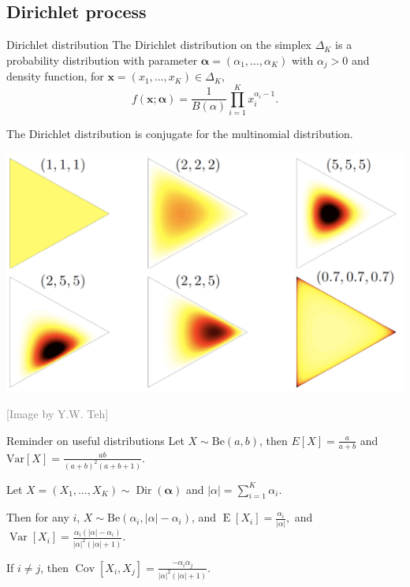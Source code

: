 \subsection{Dirichlet process}

\begin{frame}{Dirichlet distribution}
	The \alert{Dirichlet distribution} on the simplex $\Delta_K$ is a probability distribution with parameter $\boldsymbol{\alpha} = (\alpha_1,\ldots,\alpha_K)$ with $\alpha_j>0$ and density function, for $\boldsymbol{x} = (x_1, \ldots, x_K)\in \Delta_K$,
\begin{displaymath}
f(\boldsymbol{x}; \boldsymbol{\alpha}) = \frac{1}{B(\alpha)}\prod_{i=1}^Kx_i^{\alpha_i - 1}.
\end{displaymath}

The Dirichlet distribution is \alert{conjugate} for the \alert{multinomial distribution}. 

\begin{center}
\includegraphics[width = .6\textwidth]{figures_julyan/intro_DP/dirichlet_distribution}
\end{center}
\hfill\textcolor{gray}{[Image by Y.W. Teh]}
\end{frame}


\begin{frame}{Reminder on useful distributions}
	Let \alert{$X\sim \text{Be}(a,b)$}, then $\displaystyle E[X] = \frac{a}{a+b}$ and $\displaystyle\text{Var}[X]=\frac{ab}{(a+b)^2(a+b+1)}$.
	
	Let \alert{${\displaystyle X=(X_{1},\ldots ,X_{K})\sim \operatorname {Dir} ({\boldsymbol {\alpha }})}$} and ${\displaystyle |\alpha|=\sum _{i=1}^{K}\alpha _{i}}$. 
	
	Then for any $i$, $X\sim \text{Be}(\alpha_i,|\alpha|-\alpha_i)$, and ${\displaystyle \operatorname {E} [X_{i}]={\frac {\alpha _{i}}{|\alpha|}},}$ and ${\displaystyle \operatorname {Var} [X_{i}]={\frac {\alpha _{i}(|\alpha|-\alpha _{i})}{|\alpha|^{2}(|\alpha|+1)}}.}$ 
	
	If $i\neq j$, then ${\displaystyle \operatorname {Cov} [X_{i},X_{j}]={\frac {-\alpha _{i}\alpha _{j}}{|\alpha|^{2}(|\alpha|+1)}}.}$
\end{frame}


